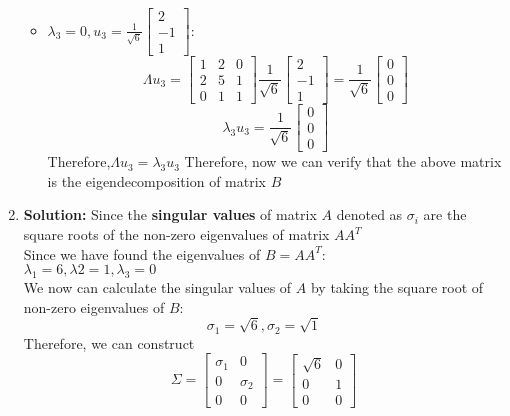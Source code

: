 \begin{enumerate}
\begin{itemize}
        \item \( \lambda_3 = 0 , u_3 = \frac{1}{\sqrt{6}}\begin{bmatrix}
                2 \\ -1 \\ 1
              \end{bmatrix} \):\\
            \[
                \Lambda u_3 = 
                \begin{bmatrix}
                     1 & 2 & 0 \\
                     2 & 5 & 1 \\
                     0 & 1 & 1 
                \end{bmatrix} \frac{1}{\sqrt{6}} 
                \begin{bmatrix}
                    2 \\ -1 \\ 1
                \end{bmatrix} = \frac{1}{\sqrt{6}}\begin{bmatrix}
                    0 \\ 0 \\ 0
                \end{bmatrix}
            \]
            \[
                \lambda_3 u_3 = \frac{1}{\sqrt{6}} \begin{bmatrix}
                    0 \\ 0 \\ 0
                  \end{bmatrix}
            \]
            Therefore,\(\Lambda u_3 = \lambda_3 u_3\)
            Therefore, now we can verify that the above matrix is the eigendecomposition of matrix \(B\)
        \end{itemize}
    \item \textbf{Solution:}
        Since the \textbf{singular values} of matrix \(A\) denoted as \(\sigma_i\) are the square roots of the non-zero
        eigenvalues of matrix \( AA^T \) \\
        Since we have found the eigenvalues of \(B = A A^T\):\\
        \(\lambda_{1} = 6, \lambda{2} = 1, \lambda_{3} = 0 \) \\
        We now can calculate the singular values of \(A\) by taking the square root of non-zero eigenvalues of \(B\):\\
        \[
            \sigma_1 = \sqrt{6},
            \sigma_2 = \sqrt{1}
        \] 
        Therefore, we can construct 
        \[
        \Sigma = \begin{bmatrix}
            \sigma_1 & 0 \\
            0 & \sigma_2\\
            0 & 0
          \end{bmatrix} = \begin{bmatrix}
            \sqrt{6} & 0\\
            0 & 1\\
            0 & 0
            \end{bmatrix}
        \] 
        

\end{enumerate}
